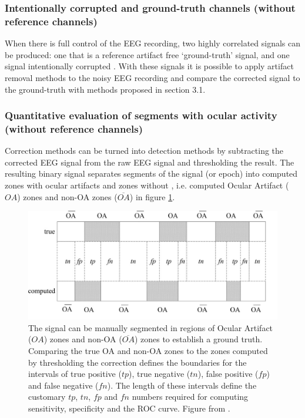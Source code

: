 \documentclass[twoside]{article}
\begin{document}
\subsubsection{Intentionally corrupted and ground-truth channels (without reference channels)}
When there is full control of the EEG recording, two highly correlated signals can be produced: one that is a reference artifact free `ground-truth' signal, and one signal intentionally corrupted \cite{eval}. With these signals it is possible to apply artifact removal methods to the noisy EEG recording and compare the corrected signal to the ground-truth with methods proposed in section 3.1. 

\subsubsection{Quantitative evaluation of segments with ocular activity (without reference channels)}
Correction methods can be turned into detection methods by subtracting the corrected EEG signal from the raw EEG signal and thresholding the result. The resulting binary signal separates segments of the signal (or epoch) into computed zones with ocular artifacts and zones without \cite{evaleogdriving}, i.e. computed Ocular Artifact ($OA$) zones and non-OA zones ($\overline{OA}$) in figure \ref{fig:oa}.

\begin{figure}[h]
\centering

  \includegraphics[width=.9\linewidth]{quantitative}
  \caption{The signal can be manually segmented in regions of Ocular Artifact ($OA$) zones and non-OA ($\overline{OA}$) zones to establish a ground truth. Comparing the true OA and non-OA zones to the zones computed by thresholding the correction defines the boundaries for the intervals of true positive ($tp$), true negative ($tn$), false positive ($fp$) and false negative ($fn$).  The length of these intervals define the customary $tp$, $tn$, $fp$ and $fn$ numbers required for computing sensitivity, specificity and the ROC curve. Figure from \cite{evaleogdriving}.}
  

\label{fig:oa}
\end{figure}
\end{document}
